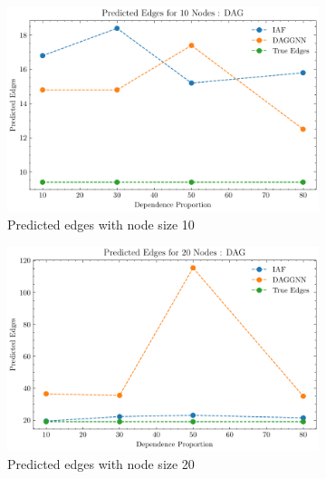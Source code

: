 \documentclass[10pt]{article}
\begin{document}
\begin{figure}[H]
    \centering
    \begin{subfigure}{0.45\textwidth}
        \includegraphics[width=\textwidth]{fig/Predicted Edges_dependence_10_DAG_threshold0.3.pdf}
        \caption{Predicted edges with node size 10}
        \label{pred_edge_node10}
    \end{subfigure}
    \hfill
    \begin{subfigure}{0.45\textwidth}
        \includegraphics[width=\textwidth]{fig/Predicted Edges_dependence_20_DAG_threshold0.3.pdf}
        \caption{Predicted edges with node size 20}
        \label{pred_edge_node20}
    \end{subfigure}
    \begin{subfigure}{0.45\textwidth}

\end{subfigure}
\end{figure}
\end{document}
